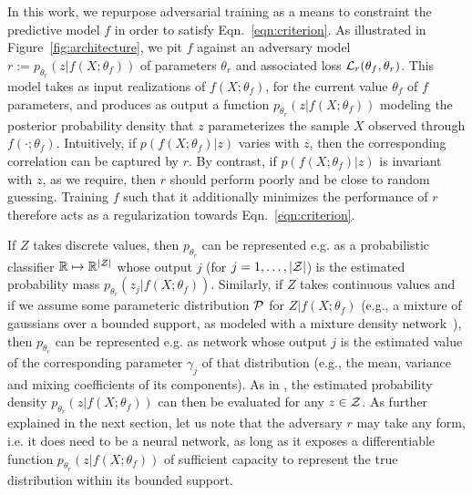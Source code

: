 \documentclass[twocolumn,superscriptaddress,aps]{revtex4-1}
\theoremstyle{plain}
\begin{document}
In this work, we repurpose adversarial training as a means to constraint the
predictive model $f$ in order to satisfy Eqn.~\ref{eqn:criterion}. As
illustrated in Figure~\ref{fig:architecture}, we pit $f$ against an adversary
model $r := p_{\theta_r}(z | f(X;\theta_f))$ of parameters $\theta_r$ and
associated loss ${\cal L}_r(\theta_f, \theta_r)$. This model takes  as input
realizations of $f(X; \theta_f)$, for the current value $\theta_f$ of $f$
parameters, and produces as output a function $p_{\theta_r}(z | f(X;\theta_f))$
modeling the posterior probability density that $z$ parameterizes the sample $X$
observed through $f(\cdot;\theta_f)$.
Intuitively, if $p(f(X; \theta_f)|z)$ varies with $z$,
then the corresponding correlation can be captured by $r$. By contrast, if
$p(f(X; \theta_f)|z)$ is invariant with $z$, as we require, then $r$ should
perform poorly and be close to random guessing. Training $f$ such that it
additionally minimizes the performance of $r$ therefore acts as a regularization
towards Eqn.~\ref{eqn:criterion}.

If $Z$ takes discrete values, then $p_{\theta_r}$ can be represented e.g. as a
probabilistic classifier $\mathbb{R} \mapsto \mathbb{R}^{|{\cal Z|}}$ whose
output $j$ (for $j=1, \dots, |{\cal Z}|$) is the estimated probability mass
$p_{\theta_r}(z_j|f(X;\theta_f))$. Similarly, if $Z$ takes continuous values and
if we assume some parameteric distribution ${\cal P}$ for $Z|f(X;\theta_f)$
(e.g., a mixture of gaussians over a bounded support, as modeled with a mixture
density network~\citep{bishop1994mixture}), then $p_{\theta_r}$ can be
represented e.g. as network whose output $j$ is the estimated value of the
corresponding parameter $\gamma_j$ of that distribution (e.g., the mean,
variance and mixing coefficients of its components). As in
\citep{nix1994estimating,bishop1994mixture}, the estimated probability density
$p_{\theta_r}(z|f(X;\theta_f))$ can then be evaluated for any $z \in {\cal Z}$.
As further explained in the next section, let us note that the adversary $r$ may
take any form, i.e. it does need to be a neural network, as long as it exposes a
differentiable function $p_{\theta_r}(z|f(X;\theta_f))$ of sufficient capacity
to represent the true distribution within its bounded support.
\end{document}
